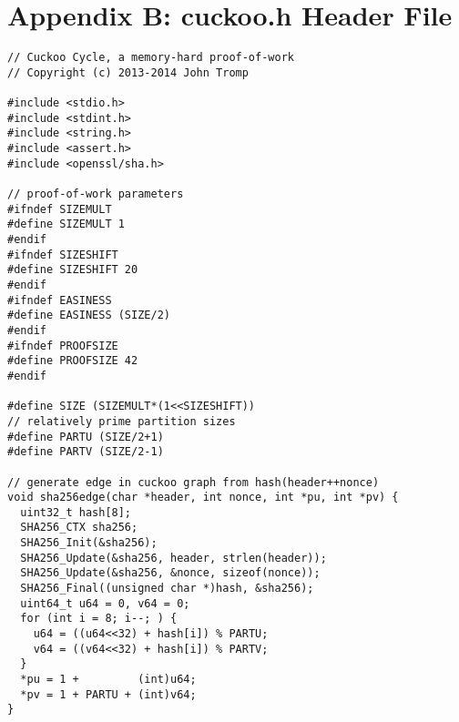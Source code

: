 \documentclass[11pt, oneside]{article}
\begin{document}
\section{Appendix B: cuckoo.h Header File}
\footnotesize
\begin{verbatim}
// Cuckoo Cycle, a memory-hard proof-of-work
// Copyright (c) 2013-2014 John Tromp

#include <stdio.h>
#include <stdint.h>
#include <string.h>
#include <assert.h>
#include <openssl/sha.h>

// proof-of-work parameters
#ifndef SIZEMULT 
#define SIZEMULT 1
#endif
#ifndef SIZESHIFT 
#define SIZESHIFT 20
#endif
#ifndef EASINESS 
#define EASINESS (SIZE/2)
#endif
#ifndef PROOFSIZE 
#define PROOFSIZE 42
#endif

#define SIZE (SIZEMULT*(1<<SIZESHIFT))
// relatively prime partition sizes
#define PARTU (SIZE/2+1)
#define PARTV (SIZE/2-1)

// generate edge in cuckoo graph from hash(header++nonce)
void sha256edge(char *header, int nonce, int *pu, int *pv) {
  uint32_t hash[8];
  SHA256_CTX sha256;
  SHA256_Init(&sha256);
  SHA256_Update(&sha256, header, strlen(header));
  SHA256_Update(&sha256, &nonce, sizeof(nonce));
  SHA256_Final((unsigned char *)hash, &sha256);
  uint64_t u64 = 0, v64 = 0;
  for (int i = 8; i--; ) {
    u64 = ((u64<<32) + hash[i]) % PARTU;
    v64 = ((v64<<32) + hash[i]) % PARTV;
  }
  *pu = 1 +         (int)u64;
  *pv = 1 + PARTU + (int)v64;
}
\end{verbatim}
\end{document}
